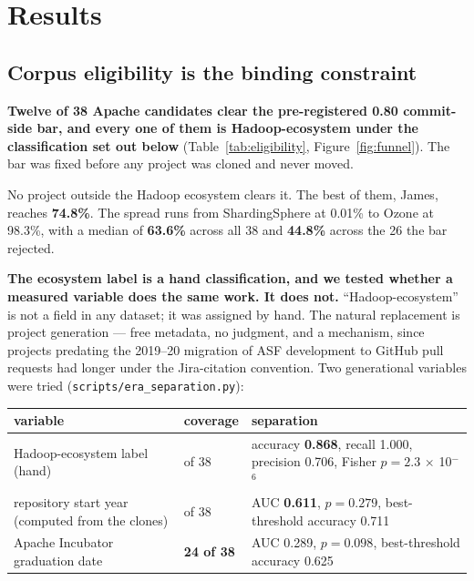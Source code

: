 \documentclass[sigconf,review,anonymous]{acmart}
\begin{document}
\section{Results}
\label{sec:4}

\subsection{Corpus eligibility is the binding constraint}
\label{sec:4.1}

\textbf{Twelve of 38 Apache candidates clear the pre-registered 0.80 commit-side bar, and every one of them is Hadoop-ecosystem under the classification set out below} (Table~\ref{tab:eligibility}, Figure~\ref{fig:funnel}). The bar was fixed before any project was cloned and never moved.

No project outside the Hadoop ecosystem clears it. The best of them, James, reaches \textbf{74.8\%}. The spread runs from ShardingSphere at 0.01\% to Ozone at 98.3\%, with a median of \textbf{63.6\%} across all 38 and \textbf{44.8\%} across the 26 the bar rejected.

\textbf{The ecosystem label is a hand classification, and we tested whether a measured variable does the same work. It does not.} ``Hadoop-ecosystem'' is not a field in any dataset; it was assigned by hand. The natural replacement is project generation --- free metadata, no judgment, and a mechanism, since projects predating the 2019--20 migration of ASF development to GitHub pull requests had longer under the Jira-citation convention. Two generational variables were tried (\texttt{scripts/\allowbreak{}era\_\allowbreak{}separation.\allowbreak{}py}):

\begin{table}[htbp]
\centering
\begingroup\footnotesize\setlength{\tabcolsep}{3pt}
\begin{tabular}{>{\raggedright\arraybackslash}p{}>{\raggedright\arraybackslash}p{}>{\raggedright\arraybackslash}p{}}
\toprule
\textbf{variable} & \textbf{coverage} & \textbf{separation} \\
\midrule
Hadoop-\allowbreak{}ecosystem label (hand) & 38 of 38 & accuracy \textbf{0.868}, recall 1.000, precision 0.706, Fisher $p = 2.3$ $\times$ 10$^{-\allowbreak{}}$$^{6}$ \\
repository start year (computed from the clones) & 38 of 38 & AUC \textbf{0.611}, $p = 0.279$, best-\allowbreak{}threshold accuracy 0.711 \\
Apache Incubator graduation date & \textbf{24 of 38} & AUC 0.289, $p = 0.098$, best-\allowbreak{}threshold accuracy 0.625 \\
\bottomrule
\end{tabular}
\endgroup
\end{table}
\end{document}
